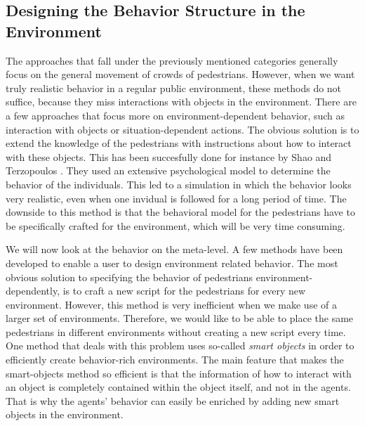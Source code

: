 \documentclass[11pt]{article}
\begin{document}
\subsection{Designing the Behavior Structure in the Environment}
The approaches that fall under the previously mentioned categories generally focus on the general movement of crowds of pedestrians. However, when we want truly realistic behavior in a regular public environment, these methods do not suffice, because they miss interactions with objects in the environment. There are a few approaches that focus more on environment-dependent behavior, such as interaction with objects or situation-dependent actions.
The obvious solution is to extend the knowledge of the pedestrians with instructions about how to interact with these objects. This has been succesfully done for instance by Shao and Terzopoulos \cite{A_autonomouspedestrians}. They used an extensive psychological model to determine the behavior of the individuals. This led to a simulation in which the behavior looks very realistic, even when one invidual is followed for a long period of time. The downside to this method is that the behavioral model for the pedestrians have to be specifically crafted for the environment, which will be very time consuming.

We will now look at the behavior on the meta-level. A few methods have been developed to enable a user to design environment related behavior. The most obvious solution to specifying the behavior of pedestrians environment-dependently, is to craft a new script for the pedestrians for every new environment. However, this method is very inefficient when we make use of a larger set of environments. Therefore, we would like to be able to place the same pedestrians in different environments without creating a new script every time.  One method that deals with this problem uses so-called \emph{smart objects} in order to efficiently create behavior-rich environments. The main feature that makes the smart-objects method so efficient is that the information of how to interact with an object is completely contained within the object itself, and not in the agents. That is why the agents' behavior can easily be enriched by adding new smart objects in the environment.
\end{document}
